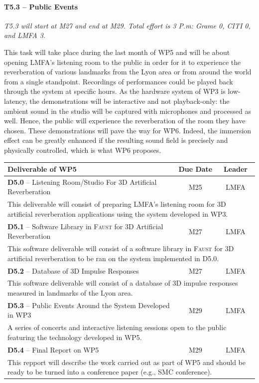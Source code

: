 \documentclass[a4paper,9pt]{extarticle}
\newcommand{\F}{\textsc{Faust}}
\begin{document}
\paragraph{T5.3 -- Public Events}

\textit{T5.3 will start at M27 and end at M29. Total effort is 3 P.m: Grame 0, CITI 0, and LMFA 3.}

This task will take place during the last month of WP5 and will be about opening LMFA's listening room to the public in order for it to experience the reverberation of various landmarks from the Lyon area or from around the world from a single standpoint. Recordings of performances could be played back through the system at specific hours. As the hardware system of WP3 is low-latency, the demonstrations will be interactive and not playback-only: the ambient sound in the studio will be captured with microphones and processed as well. Hence, the public will experience the reverberation of the room they have chosen. These demonstrations will pave the way for WP6. Indeed, the immersion effect can be greatly enhanced if the resulting sound field is precisely and physically controlled, which is what WP6 proposes.
 
\begin{center}
\begin{tabular}{p{12cm} | c | c}
\textbf{Deliverable of WP5} & \textbf{Due Date} & \textbf{Leader}\\
\hline
\hline
\textbf{D5.0} -- Listening Room/Studio For 3D Artificial Reverberation & M25 & LMFA\\
\hline
\multicolumn{3}{p{16cm}}{This deliverable will consist of preparing LMFA's listening room for 3D artificial reverberation applications using the system developed in WP3.}\\
\hline
\hline
\textbf{D5.1} -- Software Library in \F{} for 3D Artificial Reverberation & M27 & LMFA\\
\hline
\multicolumn{3}{p{16cm}}{This software deliverable will consist of a software library in \F{} for 3D artificial reverberation to be ran on the system implemented in D5.0.}\\
\hline
\hline
\textbf{D5.2} -- Database of 3D Impulse Responses & M27 & LMFA\\
\hline
\multicolumn{3}{p{16cm}}{This software deliverable will consist of a database of 3D impulse responses measured in landmarks of the Lyon area.}\\
\hline
\hline
\textbf{D5.3} -- Public Events Around the System Developed in WP3 & M29 & LMFA\\
\hline
\multicolumn{3}{p{16cm}}{A series of concerts and interactive listening sessions open to the public featuring the technology developed in WP5.}\\
\hline
\hline
\textbf{D5.4} -- Final Report on WP5 & M29 & LMFA\\
\hline
\multicolumn{3}{p{16cm}}{This repport will describe the work carried out as part of WP5 and should be ready to be turned into a conference paper (e.g., SMC conference).}\\
\end{tabular}
\end{center}
\end{document}
